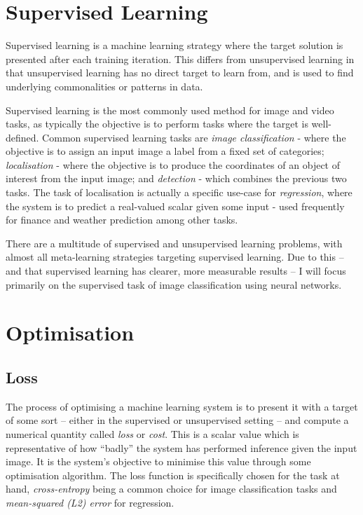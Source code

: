 \documentclass{report}
\begin{document}
\section{Supervised Learning}
Supervised learning is a machine learning strategy where the target solution is presented after each training iteration. This differs from unsupervised learning in that unsupervised learning has no direct target to learn from, and is used to find underlying commonalities or patterns in data. \par
Supervised learning is the most commonly used method for image and video tasks, as typically the objective is to perform tasks where the target is well-defined. Common supervised learning tasks are \emph{image classification} - where the objective is to assign an input image a label from a fixed set of categories; \emph{localisation} - where the objective is to produce the coordinates of an object of interest from the input image; and \emph{detection} - which combines the previous two tasks. The task of localisation is actually a specific use-case for \emph{regression}, where the system is to predict a real-valued scalar given some input - used frequently for finance and weather prediction among other tasks. \par
There are a multitude of supervised and unsupervised learning problems, with  almost all meta-learning strategies targeting supervised learning. Due to this -- and that supervised learning has clearer, more measurable results -- I will focus primarily on the supervised task of image classification using neural networks. \par


\section{Optimisation}
\subsection{Loss} \label{loss:1}
The process of optimising a machine learning system is to present it with a target of some sort -- either in the supervised or unsupervised setting -- and compute a numerical quantity called \textit{loss} or \textit{cost}. This is a scalar value which is representative of how ``badly'' the system has performed inference given the input image. It is the system's objective to minimise this value through some optimisation algorithm. The loss function is specifically chosen for the task at hand, \textit{cross-entropy} being a common choice for image classification tasks and \textit{mean-squared (L2) error}  for regression. \\
\end{document}
